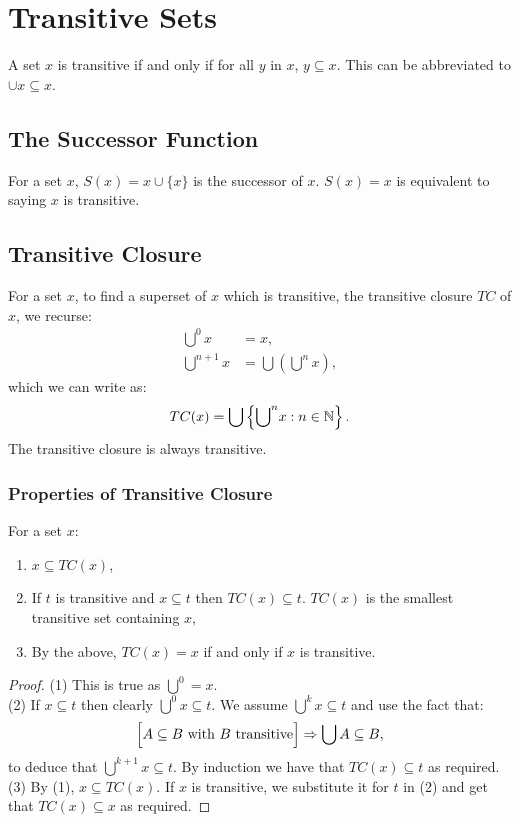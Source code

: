 \section{Transitive Sets}

A set $x$ is transitive if and only if
for all $y$ in $x$, $y \subseteq x$.
This can be abbreviated to $\cup x \subseteq x$.

\subsection{The Successor Function}

For a set $x$, $S(x) = x \cup \{x\}$ is the successor of $x$.
$S(x) = x$ is equivalent to saying $x$ is transitive.

\subsection{Transitive Closure}

For a set $x$, to find a superset of $x$ which is transitive,
the transitive closure $TC$ of $x$, we recurse: \begin{align*}
    {\bigcup}^0 x &= x, \\
    {\bigcup}^{n + 1} x &= \bigcup\left({\bigcup}^n x\right),
\end{align*} which we can write as: \begin{align*}
    TC(x) = \bigcup\left\{{\bigcup}^n x : n \in \mathbb{N}\right\}.
\end{align*} The transitive closure is always transitive.

\subsubsection{Properties of Transitive Closure}

For a set $x$: \begin{enumerate}
    \item $x \subseteq TC(x)$,
    \item If $t$ is transitive and $x \subseteq t$ then
        $TC(x) \subseteq t$. $TC(x)$ is the smallest
        transitive set containing $x$,
    \item By the above, $TC(x) = x$ if and only if $x$ is
        transitive.
\end{enumerate}

\begin{proof}
    (1) This is true as ${\bigcup}^0 = x$.
    \\[\baselineskip]
    (2) If $x \subseteq t$ then clearly ${\bigcup}^0 x \subseteq t$.
    We assume ${\bigcup}^k x \subseteq t$ and use the fact that: \begin{align*}
        \Bigl[A \subseteq B \text{ with } B \text{ transitive} \Bigr]
        \Rightarrow
        \bigcup A \subseteq B,
    \end{align*} to deduce that ${\bigcup}^{k + 1} x \subseteq t$. By
    induction we have that $TC(x) \subseteq t$ as required.
    \\[\baselineskip]
    (3) By (1), $x \subseteq TC(x)$. If $x$ is transitive, we substitute
    it for $t$ in (2) and get that $TC(x) \subseteq x$ as required.
\end{proof}
